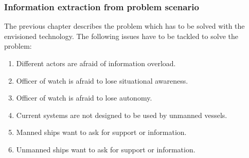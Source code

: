 \subsubsection{Information extraction from problem scenario}
The previous chapter describes the problem which has to be solved with the envisioned technology. The following issues have to be tackled to solve the problem:
\begin{spacing}{1}
	\begin{enumerate}
		\item Different actors are afraid of information overload.
		\item Officer of watch is afraid to lose situational awareness.
		\item Officer of watch is afraid to lose autonomy.
		\item Current systems are not designed to be used by unmanned vessels.
		\item Manned ships want to ask for support or information.
		\item Unmanned ships want to ask for support or information.
	\end{enumerate}
\end{spacing}

